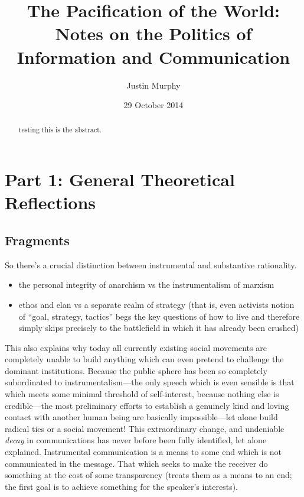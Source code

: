 \documentclass[12pt,book]{article}
\title{The Pacification of the World: Notes on the Politics of Information and
Communication}
\author{Justin Murphy}
\date{29 October 2014}
\begin{document}
\maketitle

\begin{abstract}
testing this is the abstract.
\end{abstract}

\clearpage

{
\hypersetup{linkcolor=black}
\setcounter{tocdepth}{2}
\tableofcontents
}
\section{Part 1: General Theoretical
Reflections}\label{part-1-general-theoretical-reflections}

\subsection{Fragments}\label{fragments}

So there's a crucial distinction between instrumental and substantive
rationality.

\begin{itemize}
\item
  the personal integrity of anarchism vs the instrumentalism of marxism
\item
  ethos and elan vs a separate realm of strategy (that is, even
  activists notion of ``goal, strategy, tactics'' begs the key questions
  of how to live and therefore simply skips precisely to the battlefield
  in which it has already been crushed)
\end{itemize}

This also explains why today all currently existing social movements are
completely unable to build anything which can even pretend to challenge
the dominant institutions. Because the public sphere has been so
completely subordinated to instrumentalism---the only speech which is
even sensible is that which meets some minimal threshold of
self-interest, because nothing else is credible---the most preliminary
efforts to establish a genuinely kind and loving contact with another
human being are basically impossible---let alone build radical ties or a
social movement! This extraordinary change, and undeniable \emph{decay}
in communications has never before been fully identified, let alone
explained. Instrumental communication is a means to some end which is
not communicated in the message. That which seeks to make the receiver
do something at the cost of some transparency (treats them as a means to
an end; the first goal is to achieve something for the speaker's
interests).
\end{document}
